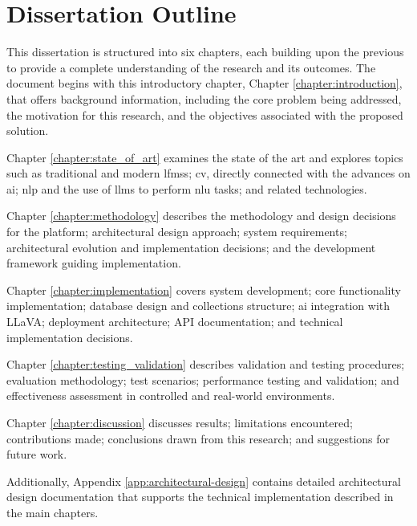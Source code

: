 \section{Dissertation Outline} \label{section:dissertation_outline}

This dissertation is structured into six chapters, each building upon the previous to provide a complete understanding of the research and its outcomes. The document begins with this introductory chapter, Chapter \ref{chapter:introduction}, that offers background information, including the core problem being addressed, the motivation for this research, and the objectives associated with the proposed solution.

Chapter \ref{chapter:state_of_art} examines the state of the art and explores topics such as traditional and modern \acp{lfms}; \ac{cv}, directly connected with the advances on \ac{ai}; \ac{nlp} and the use of \acp{llm} to perform \ac{nlu} tasks; and related technologies.

Chapter \ref{chapter:methodology} describes the methodology and design decisions for the platform; architectural design approach; system requirements; architectural evolution and implementation decisions; and the development framework guiding implementation.

Chapter \ref{chapter:implementation} covers system development; core functionality implementation; database design and collections structure; \ac{ai} integration with LLaVA; deployment architecture; API documentation; and technical implementation decisions.

Chapter \ref{chapter:testing_validation} describes validation and testing procedures; evaluation methodology; test scenarios; performance testing and validation; and effectiveness assessment in controlled and real-world environments.

Chapter \ref{chapter:discussion} discusses results; limitations encountered; contributions made; conclusions drawn from this research; and suggestions for future work.

Additionally, Appendix \ref{app:architectural-design} contains detailed architectural design documentation that supports the technical implementation described in the main chapters.
